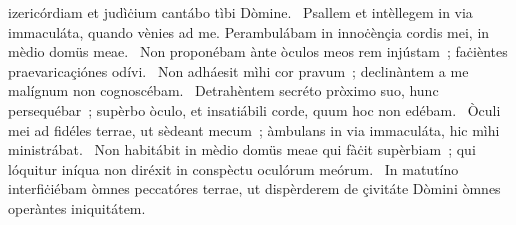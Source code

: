 \psalmChapterWithInscription{}
{ }
{%
izericórdiam et judìċium cantábo tìbi Dòmine. 
~Psallem et intèllegem in via immaculáta, quando vènies ad me. Perambulábam in innoċènçia cordis mei, in mèdio domüs meae. 
~Non proponébam ànte òculos meos rem injústam~; faċièntes praevaricaçiónes odívi. 
~Non adháesit mìhi cor pravum~; declinàntem a me malígnum non cognoscébam. 
~Detrahèntem secréto pròximo suo, hunc persequébar~; supèrbo òculo, et insatiábili corde, quum hoc non edébam. 
~Òculi mei ad fidéles terrae, ut sèdeant mecum~; àmbulans in via immaculáta, hic mìhi ministrábat. 
~Non habitábit in mèdio domüs meae qui fàċit supèrbiam~; qui lóquitur iníqua non diréxit in conspèctu oculórum meórum. 
~In matutíno interfiċiébam òmnes peccatóres terrae, ut dispèrderem de çivitáte Dòmini òmnes operàntes iniquitátem. 
}
